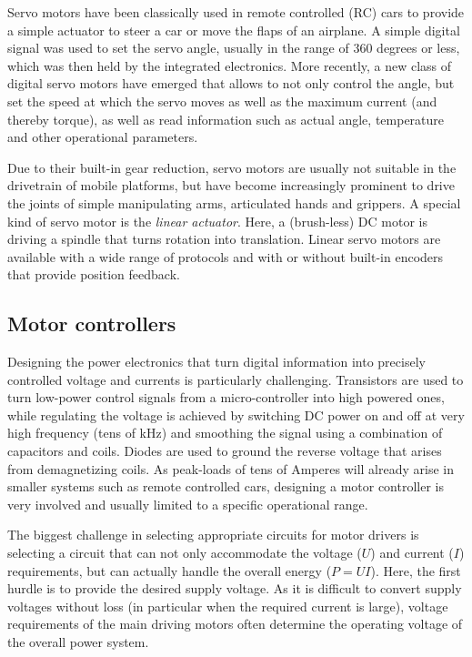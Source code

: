 Servo motors have been classically used in remote controlled (RC) cars to provide a simple actuator to steer a car or move the flaps of an airplane. A simple digital signal was used to set the servo angle, usually in the range of 360 degrees or less, which was then held by the integrated electronics. More recently, a new class of digital servo motors have emerged that allows to not only control the angle, but set the speed at which the servo moves as well as the maximum current (and thereby torque), as well as read information such as actual angle, temperature and other operational parameters.

Due to their built-in gear reduction, servo motors are usually not suitable in the drivetrain of mobile platforms, but have become increasingly prominent to drive the joints of simple manipulating arms, articulated hands and grippers.
%
A special kind of servo motor is the \textsl{linear actuator}. Here, a (brush-less) DC motor is driving a spindle that turns rotation into translation. Linear servo motors are available with a wide range of protocols and with or without built-in encoders that provide position feedback.

\subsection{Motor controllers}

Designing the power electronics that turn digital information into precisely controlled voltage and currents is particularly challenging. Transistors are used to turn low-power control signals from a micro-controller into high powered ones, while regulating the voltage is achieved by switching DC power on and off at very high frequency (tens of kHz) and smoothing the signal using a combination of capacitors and coils. Diodes are used to ground the reverse voltage that arises from demagnetizing coils. As peak-loads of tens of Amperes will already arise in smaller systems such as remote controlled cars, designing a motor controller is very involved and usually limited to a specific operational range.

The biggest challenge in selecting appropriate circuits for motor drivers is selecting a circuit that can not only accommodate the voltage ($U$) and current ($I$) requirements, but can actually handle the overall energy ($P=UI$). Here, the first hurdle is to provide the desired supply voltage. As it is difficult to convert supply voltages without loss (in particular when the required current is large), voltage requirements of the main driving motors often determine the operating voltage of the overall power system.


